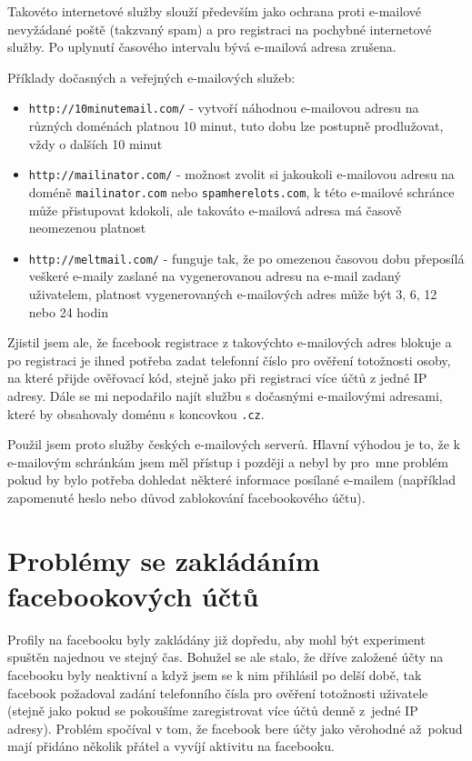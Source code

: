 \documentclass[thesis=M,czech]{FITthesis}[2013/05/10]
\begin{document}
Takovéto internetové služby slouží především jako ochrana proti e-mailové nevyžádané poště (takzvaný spam) a pro registraci na pochybné internetové služby. Po uplynutí časového intervalu bývá e-mailová adresa zrušena.

Příklady dočasných a veřejných e-mailových služeb:

\begin{itemize}
  \item \verb|http://10minutemail.com/| - vytvoří náhodnou e-mailovou adresu na různých doménách platnou 10 minut, tuto dobu lze postupně prodlužovat, vždy o dalších 10 minut
  \item \verb|http://mailinator.com/| - možnost zvolit si jakoukoli e-mailovou adresu na doméně \verb|mailinator.com| nebo \verb|spamherelots.com|, k této e-mailové schránce může přistupovat kdokoli, ale takováto e-mailová adresa má časově neomezenou platnost
  \item \verb|http://meltmail.com/| - funguje tak, že po omezenou časovou dobu přeposílá veškeré e-maily zaslané na vygenerovanou adresu na e-mail zadaný uživatelem, platnost vygenerovaných e-mailových adres může být 3, 6, 12 nebo 24 hodin
\end{itemize}

Zjistil jsem ale, že facebook registrace z takovýchto e-mailových adres blokuje a po registraci je ihned potřeba zadat telefonní číslo pro ověření totožnosti osoby, na které přijde ověřovací kód, stejně jako při registraci více účtů z jedné IP adresy. Dále se mi nepodařilo najít službu s dočasnými e-mailovými adresami, které by obsahovaly doménu s koncovkou \verb|.cz|. 

Použil jsem proto služby českých e-mailových serverů. Hlavní výhodou je to, že k e-mailovým schránkám jsem měl přístup i později a nebyl by pro~mne problém pokud by bylo potřeba dohledat některé informace posílané e-mailem (například zapomenuté heslo nebo důvod zablokování facebookového účtu).

\section{Problémy se zakládáním facebookových účtů}

Profily na facebooku byly zakládány již dopředu, aby mohl být experiment spuštěn najednou ve stejný čas. Bohužel se ale stalo, že dříve založené účty na facebooku byly neaktivní a když jsem se k nim přihlásil po delší době, tak facebook požadoval zadání telefonního čísla pro ověření totožnosti uživatele (stejně jako pokud se pokoušíme zaregistrovat více účtů denně z~jedné IP adresy). Problém spočíval v tom, že facebook bere účty jako věrohodné až~pokud mají přidáno několik přátel a vyvíjí aktivitu na facebooku. 
\end{document}
